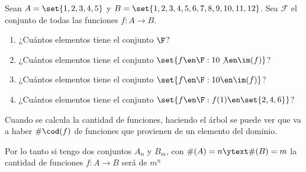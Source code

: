 \begin{enunciado}{\ejercicio}
  Sean $A = \set{1,2,3,4,5}$ y $B = \set{1,2,3,4,5,6,7,8,9,10,11,12}$. Sea $\mathcal F$ el conjunto de todas las funciones
  $f: A \to B$.
  \begin{enumerate}[label=\roman*)]
    \item  ¿Cuántos elementos tiene el conjunto $\F$?
    \item  ¿Cuántos elementos tiene el conjunto $\set{f \en \F : 10 \not\en \im(f)}$?
    \item  ¿Cuántos elementos tiene el conjunto $\set{f \en \F : 10 \en \im(f)}$?
    \item  ¿Cuántos elementos tiene el conjunto $\set{f \en \F : f(1) \en \set{2,4,6} }$?
  \end{enumerate}
\end{enunciado}

Cuando se calcula la cantidad de funciones, haciendo el árbol se puede ver que va a haber
$\#\cod(f)$ de funciones que provienen de un elemento del dominio.

Por lo tanto si tengo dos conjuntos $A_n$ y $B_m$, con $\#(A) = n \ytext \#(B) = m$ la cantidad de funciones $f : A \to B$
será de $m^n$

